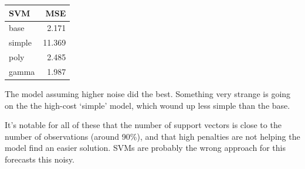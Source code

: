 \documentclass[]{article}
\newenvironment{Shaded}{\begin{snugshade}}{\end{snugshade}}
\newcommand{\KeywordTok}[1]{\textcolor[rgb]{0.13,0.29,0.53}{\textbf{#1}}}
\newcommand{\DataTypeTok}[1]{\textcolor[rgb]{0.13,0.29,0.53}{#1}}
\newcommand{\DecValTok}[1]{\textcolor[rgb]{0.00,0.00,0.81}{#1}}
\newcommand{\StringTok}[1]{\textcolor[rgb]{0.31,0.60,0.02}{#1}}
\newcommand{\ControlFlowTok}[1]{\textcolor[rgb]{0.13,0.29,0.53}{\textbf{#1}}}
\newcommand{\OperatorTok}[1]{\textcolor[rgb]{0.81,0.36,0.00}{\textbf{#1}}}
\newcommand{\NormalTok}[1]{#1}
\begin{document}
\begin{Shaded}
\end{Shaded}

\begin{longtable}[]{@{}lr@{}}
\toprule
SVM & MSE\tabularnewline
\midrule
\endhead
base & 2.171\tabularnewline
simple & 11.369\tabularnewline
poly & 2.485\tabularnewline
gamma & 1.987\tabularnewline
\bottomrule
\end{longtable}

The model assuming higher noise did the best. Something very strange is
going on the the high-cost `simple' model, which wound up less simple
than the base.

It's notable for all of these that the number of support vectors is
close to the number of observations (around 90\%), and that high
penalties are not helping the model find an easier solution. SVMs are
probably the wrong approach for this forecasts this noisy.
\end{document}
